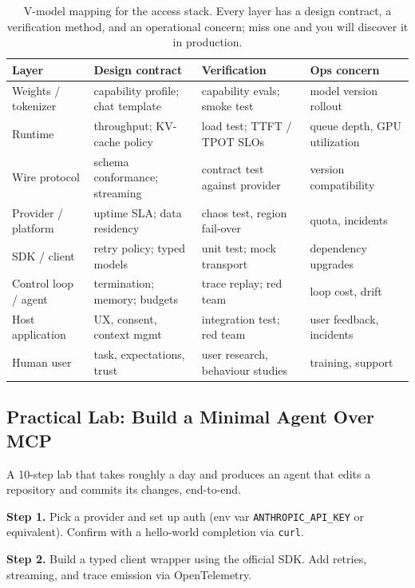\begin{table}[H]
\centering
\footnotesize
\begin{tabular}{L{2.6cm} L{4.2cm} L{4.2cm} L{3.0cm}}
\toprule
\textbf{Layer} & \textbf{Design contract} & \textbf{Verification} & \textbf{Ops concern} \\
\midrule
Weights / tokenizer & capability profile; chat template & capability evals; smoke test & model version rollout \\
Runtime & throughput; KV-cache policy & load test; TTFT / TPOT SLOs & queue depth, GPU utilization \\
Wire protocol & schema conformance; streaming & contract test against provider & version compatibility \\
Provider / platform & uptime SLA; data residency & chaos test, region fail-over & quota, incidents \\
SDK / client & retry policy; typed models & unit test; mock transport & dependency upgrades \\
Control loop / agent & termination; memory; budgets & trace replay; red team & loop cost, drift \\
Host application & UX, consent, context mgmt & integration test; red team & user feedback, incidents \\
Human user & task, expectations, trust & user research, behaviour studies & training, support \\
\bottomrule
\end{tabular}
\caption{V-model mapping for the access stack. Every layer has a
         design contract, a verification method, and an
         operational concern; miss one and you will discover it
         in production.}
\label{tab:vmodel_wk11}
\end{table}

\subsection{Practical Lab: Build a Minimal Agent Over MCP}

A 10-step lab that takes roughly a day and produces an agent
that edits a repository and commits its changes, end-to-end.

\textbf{Step 1.} Pick a provider and set up auth (env var
\texttt{ANTHROPIC\_API\_KEY} or equivalent). Confirm with a
hello-world completion via \texttt{curl}.

\textbf{Step 2.} Build a typed client wrapper using the official
SDK. Add retries, streaming, and trace emission via
OpenTelemetry.

